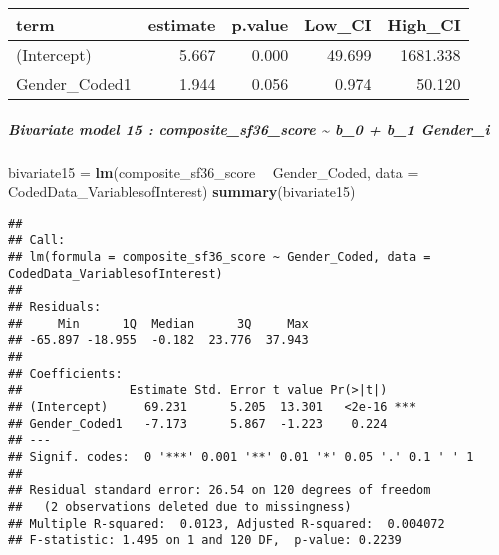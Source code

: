 \documentclass[]{article}
\newenvironment{Shaded}{\begin{snugshade}}{\end{snugshade}}
\newcommand{\DataTypeTok}[1]{\textcolor[rgb]{0.13,0.29,0.53}{#1}}
\newcommand{\DecValTok}[1]{\textcolor[rgb]{0.00,0.00,0.81}{#1}}
\newcommand{\FloatTok}[1]{\textcolor[rgb]{0.00,0.00,0.81}{#1}}
\newcommand{\KeywordTok}[1]{\textcolor[rgb]{0.13,0.29,0.53}{\textbf{#1}}}
\newcommand{\NormalTok}[1]{#1}
\newcommand{\OperatorTok}[1]{\textcolor[rgb]{0.81,0.36,0.00}{\textbf{#1}}}
\newcommand{\StringTok}[1]{\textcolor[rgb]{0.31,0.60,0.02}{#1}}
\let\oldsubparagraph\subparagraph
\renewcommand{\subparagraph}[1]{\oldsubparagraph{#1}\mbox{}}
\begin{document}
\begin{Shaded}
\end{Shaded}

\begin{longtable}[]{@{}lrrrr@{}}
\toprule
term & estimate & p.value & Low\_CI & High\_CI\tabularnewline
\midrule
\endhead
(Intercept) & 5.667 & 0.000 & 49.699 & 1681.338\tabularnewline
Gender\_Coded1 & 1.944 & 0.056 & 0.974 & 50.120\tabularnewline
\bottomrule
\end{longtable}

\hypertarget{bivariate-model-15-composite_sf36_score-b_0-b_1-gender_i}{%
\subparagraph{Bivariate model 15 : composite\_sf36\_score
\textasciitilde{} b\_0 + b\_1
Gender\_i}\label{bivariate-model-15-composite_sf36_score-b_0-b_1-gender_i}}

\begin{Shaded}
\begin{Highlighting}[]
\NormalTok{bivariate15 =}\StringTok{ }\KeywordTok{lm}\NormalTok{(composite_sf36_score }\OperatorTok{~}\StringTok{ }\NormalTok{Gender_Coded, }\DataTypeTok{data =}\NormalTok{ CodedData_VariablesofInterest)}
\KeywordTok{summary}\NormalTok{(bivariate15)}
\end{Highlighting}
\end{Shaded}

\begin{verbatim}
## 
## Call:
## lm(formula = composite_sf36_score ~ Gender_Coded, data = CodedData_VariablesofInterest)
## 
## Residuals:
##     Min      1Q  Median      3Q     Max 
## -65.897 -18.955  -0.182  23.776  37.943 
## 
## Coefficients:
##               Estimate Std. Error t value Pr(>|t|)    
## (Intercept)     69.231      5.205  13.301   <2e-16 ***
## Gender_Coded1   -7.173      5.867  -1.223    0.224    
## ---
## Signif. codes:  0 '***' 0.001 '**' 0.01 '*' 0.05 '.' 0.1 ' ' 1
## 
## Residual standard error: 26.54 on 120 degrees of freedom
##   (2 observations deleted due to missingness)
## Multiple R-squared:  0.0123, Adjusted R-squared:  0.004072 
## F-statistic: 1.495 on 1 and 120 DF,  p-value: 0.2239
\end{verbatim}
\end{document}

